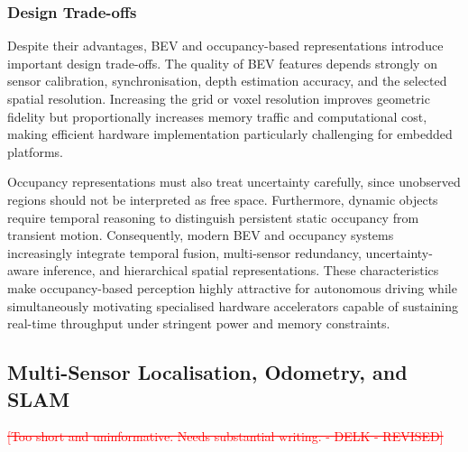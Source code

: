 \documentclass{ieeeaccess}
\newcommand{\added}[1]{\textcolor{RevisionBlue}{#1}}
\newcommand{\deleted}[1]{\textcolor{red}{\sout{#1}}}
\begin{document}
\subsubsection{Design Trade-offs}

Despite their advantages, BEV and occupancy-based representations introduce important design trade-offs. The quality of BEV features depends strongly on sensor calibration, synchronisation, depth estimation accuracy, and the selected spatial resolution. Increasing the grid or voxel resolution improves geometric fidelity but proportionally increases memory traffic and computational cost, making efficient hardware implementation particularly challenging for embedded platforms.

Occupancy representations must also treat uncertainty carefully, since unobserved regions should not be interpreted as free space. Furthermore, dynamic objects require temporal reasoning to distinguish persistent static occupancy from transient motion. Consequently, modern BEV and occupancy systems increasingly integrate temporal fusion, multi-sensor redundancy, uncertainty-aware inference, and hierarchical spatial representations. These characteristics make occupancy-based perception highly attractive for autonomous driving while simultaneously motivating specialised hardware accelerators capable of sustaining real-time throughput under stringent power and memory constraints.

\subsection{Multi-Sensor Localisation, Odometry, and SLAM}
\deleted{[Too short and uninformative. Needs substantial writing. - DELK - REVISED]}

\end{document}
